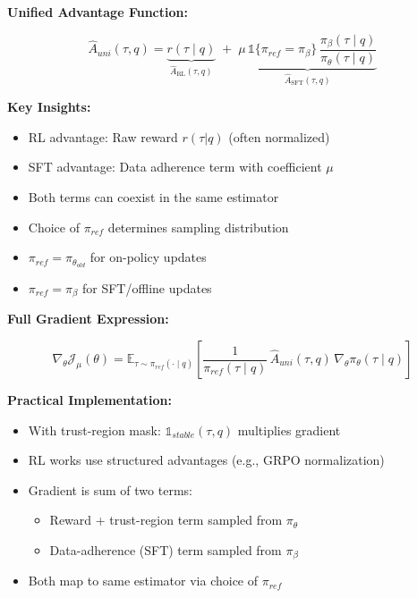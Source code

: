 \begin{frame}
\textbf{Unified Advantage Function:}

\vspace{0.2cm}

\[
\widehat{A}_{uni}(\tau,q) = \underbrace{r(\tau\mid q)}_{\widehat{A}_{\mathrm{RL}}(\tau,q)} \;+\; \underbrace{\mu\,\mathbb{1}\{\pi_{ref}=\pi_\beta\}\,\frac{\pi_\beta(\tau\mid q)}{\pi_\theta(\tau\mid q)}}_{\widehat{A}_{\mathrm{SFT}}(\tau,q)}
\]

\vspace{0.3cm}

\textbf{Key Insights:}
\begin{itemize}
    \item RL advantage: Raw reward $r(\tau|q)$ (often normalized)
    \item SFT advantage: Data adherence term with coefficient $\mu$
    \item Both terms can coexist in the same estimator
    \item Choice of $\pi_{ref}$ determines sampling distribution
    \item $\pi_{ref} = \pi_{\theta_{old}}$ for on-policy updates
    \item $\pi_{ref} = \pi_\beta$ for SFT/offline updates
\end{itemize}
\end{frame}%
\begin{frame}
\textbf{Full Gradient Expression:}

\vspace{0.2cm}

\[
\nabla_\theta \mathcal{J}_{\mu}(\theta) = \mathbb{E}_{\tau\sim \pi_{ref}(\cdot\mid q)}\!\left[
\frac{1}{\pi_{ref}(\tau\mid q)}\,
\widehat{A}_{uni}(\tau,q)\,
\nabla_\theta \pi_\theta(\tau\mid q)
\right]
\]

\vspace{0.3cm}

\textbf{Practical Implementation:}
\begin{itemize}
    \item With trust-region mask: $\mathbb{1}_{stable}(\tau,q)$ multiplies gradient
    \item RL works use structured advantages (e.g., GRPO normalization)
    \item Gradient is sum of two terms:
    \begin{itemize}
        \item Reward + trust-region term sampled from $\pi_\theta$
        \item Data-adherence (SFT) term sampled from $\pi_\beta$
    \end{itemize}
    \item Both map to same estimator via choice of $\pi_{ref}$
\end{itemize}
\end{frame}%
